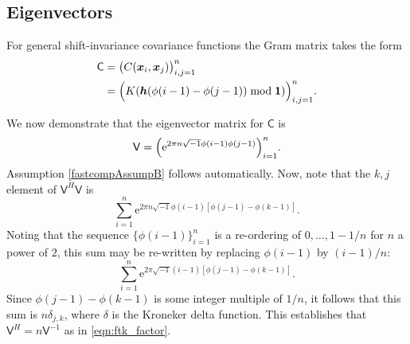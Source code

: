 \documentclass[twocolumn]{svjour3}          %
\newcommand{\bm}[1]{\boldsymbol{#1}}
\newcommand{\vh}{\bm{h}}
\newcommand{\vx}{\bm{x}}
\newcommand{\vone}{\bm{1}}
\newcommand{\mC}{\mathsf{C}}
\newcommand{\mV}{\mathsf{V}}
\newcommand{\me}{\mathrm{e}}
\begin{document}
\subsection{Eigenvectors}

For general shift-invariance covariance functions the Gram matrix takes the form
\begin{align}
\label{shInvKernGramMatrix}
\mC &= \bigl ( C(\vx_i, \vx_j) \bigr)_{i, j = 1}^n \\
& = \Bigl ( K(\vh(\phi(i-1) - \phi(j-1)) \bmod \vone ) \Bigr)_{i, j = 1}^n.
\end{align}

We now demonstrate that the eigenvector matrix for $\mC$ is 
\begin{equation} \label{latticeVdef}
\mV = \Bigl ( \me^{2 \pi n \sqrt{-1} \phi(i-1)\phi(j-1)} \Bigr)_{i = 1}^n.
\end{equation}
Assumption \eqref{fastcompAssumpB} follows automatically.
Now, note that the $k,j$ element of $\mV^H\mV$ is
\begin{equation*}
\sum_{i=1}^n \me^{2 \pi n \sqrt{-1} \phi(i-1)[\phi(j-1) - \phi(k-1)]}.
\end{equation*}
Noting that the sequence $\{\phi(i-1)\}_{i=1}^n$ is a re-ordering of $0, \ldots, 1-1/n$ for $n$ a power of $2$, this sum may be re-written by replacing $\phi(i-1)$ by $(i-1)/n$:
\begin{equation*}
\sum_{i=1}^n \me^{2 \pi \sqrt{-1} (i-1)[\phi(j-1) - \phi(k-1)]}.
\end{equation*}
Since $\phi(j-1) - \phi(k-1)$ is some integer multiple of $1/n$, it follows that this sum is $n \delta_{j,k}$, where $\delta$ is the Kroneker delta function.  This establishes that $\mV^H = n \mV^{-1}$ as in \eqref{eqn:ftk_factor}.
\end{document}
